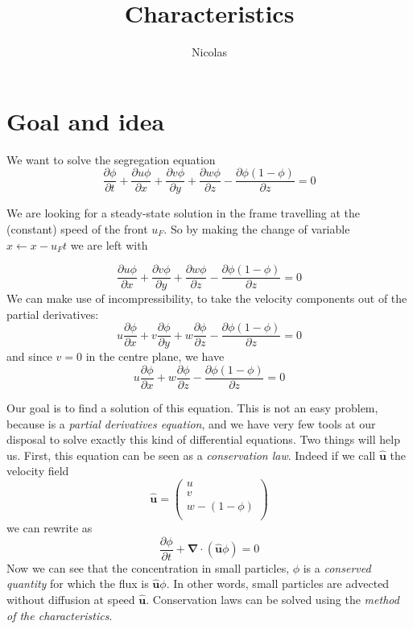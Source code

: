 \documentclass[11pt]{article}
\title{\textbf{Characteristics}}
\author{Nicolas}
\date{}
\newcommand{\p}[2]{\ensuremath{\frac{\partial {#1}}{\partial {#2}}}}
\begin{document}
\maketitle

\section{Goal and idea}
We want to solve the segregation equation
\begin{equation} \label{eq:conservative_form}
	\p{\phi}{t} + \p{u\phi}{x} + \p{v\phi}{y} + \p{w\phi}{z} - \p{\phi(1-\phi)}{z} = 0
\end{equation}

We are looking for a steady-state solution in the frame travelling at the (constant) speed of the front $u_F$. So by making the change of variable $ x \leftarrow x - u_F t$ we are left with

\begin{equation}
	\p{u\phi}{x} + \p{v\phi}{y} + \p{w\phi}{z} - \p{\phi(1-\phi)}{z} = 0
\end{equation}
We can make use of incompressibility, to take the velocity components out of the partial derivatives:
\begin{equation}
	u\p{\phi}{x} + v\p{\phi}{y} + w\p{\phi}{z} - \p{\phi(1-\phi)}{z} = 0
\end{equation}
and since $v = 0$ in the centre plane, we have
\begin{equation} \label{eq:segreg}
	u\p{\phi}{x} + w\p{\phi}{z} - \p{\phi(1-\phi)}{z} = 0
\end{equation}

Our goal is to find a solution of this equation. 
This is not an easy problem, because \cite{eq:segreg} is a \textit{partial derivatives equation}, and we have very few tools at our disposal to solve exactly this kind of differential equations.
Two things will help us. 
First, this equation can be seen as a \textit{conservation law}. Indeed if we call $\mathbf{\hat{u}}$ the velocity field 
\begin{equation}
	\mathbf{\hat{u}} = 
	\begin{pmatrix}
	u\\
	v\\
	w - (1 -\phi)\\
	\end{pmatrix}
\end{equation}
we can rewrite \cite{eq:conservative_form} as
\begin{equation}
	\p{\phi}{t} + \mathbf{\nabla} \cdot (\mathbf{\hat{u}} \phi) = 0
\end{equation}
Now we can see that the concentration in small particles,  $\phi$ is a \textit{conserved quantity} for which the flux is $\mathbf{\hat{u}} \phi$. In other words, small particles are advected without diffusion at speed $\mathbf{\hat{u}}$. 
Conservation laws can be solved using the \textit{method of the characteristics}.
\end{document}
